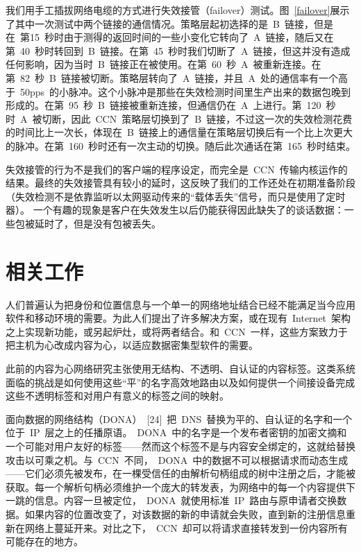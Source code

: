 我们用手工插拔网络电缆的方式进行失效接管（failover）测试。图~\ref{failover}展示了其中一次测试中两个链接的通信情况。策略层起初选择的是~B~链接，但是在~第15~秒时由于测得的返回时间的一些小变化它转向了~A~链接，随后又在第~40~秒时转回到~B~链接。在第~45~秒时我们切断了~A~链接，但这并没有造成任何影响，因为当时~B~链接正在被使用。在第~60~秒~A~被重新连接。在第~82~秒~B~链接被切断。策略层转向了~A~链接，并且~A~处的通信率有一个高于~50pps~的小脉冲。这个小脉冲是那些在失效检测时间里生产出来的数据包晚到形成的。在第~95~秒~B~链接被重新连接，但通信仍在~A~上进行。第~120~秒时~A~被切断，因此~CCN~策略层切换到了~B~链接，不过这一次的失效检测花费的时间比上一次长，体现在~B~链接上的通信量在策略层切换后有一个比上次更大的脉冲。在第~160~秒时还有一次主动的切换。随后此次通话在第~165~秒时结束。

失效接管的行为不是我们的客户端的程序设定，而完全是~CCN~传输内核运作的结果。最终的失效接管具有较小的延时，这反映了我们的工作还处在初期准备阶段（失效检测不是依靠监听以太网驱动传来的“载体丢失”信号，而只是使用了定时器）。 一个有趣的现象是客户在失效发生以后仍能获得因此缺失了的谈话数据：一些包被延时了，但是没有包被丢失。

\section{相关工作}
\label{sec:7}
人们普遍认为把身份和位置信息与一个单一的网络地址结合已经不能满足当今应用软件和移动环境的需要。为此人们提出了许多解决方案，或在现有~Internet~架构之上实现新功能，或另起炉灶，或将两者结合。和~CCN~一样，这些方案致力于把主机为心改成内容为心，以适应数据密集型软件的需要。

此前的内容为心网络研究主张使用无结构、不透明、自认证的内容标签。这类系统面临的挑战是如何使用这些“平”的名字高效地路由以及如何提供一个间接设备完成这些不透明标签和对用户有意义的标签之间的映射。

面向数据的网络结构（DONA）~[24]~把~DNS~替换为平的、自认证的名字和一个位于~IP~层之上的任播原语。~DONA~中的名字是一个发布者密钥的加密文摘和一个可能对用户友好的标签——然而这个标签不是与内容安全绑定的，这就给替换攻击以可乘之机。与~CCN~不同，~DONA~中的数据不可以根据请求而动态生成——它们必须先被发布，在一棵受信任的由解析句柄组成的树中注册之后，才能被获取。每一个解析句柄必须维护一个庞大的转发表，为网络中的每一个内容提供下一跳的信息。内容一旦被定位，~DONA~就使用标准~IP~路由与原申请者交换数据。如果内容的位置改变了，对该数据的新的申请就会失败，直到新的注册信息重新在网络上蔓延开来。对比之下，~CCN~却可以将请求直接转发到一份内容所有可能存在的地方。

